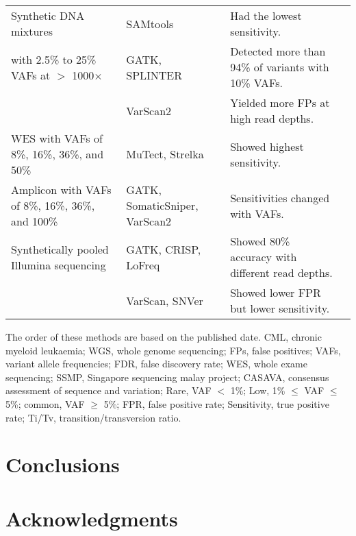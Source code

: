 \documentclass[11pt,reqno]{amsart}
\begin{document}
\begin{landscape}
\begin{table}[htbp]
\begin{threeparttable}
\begin{tabular}{rlrr}
    \midrule
    \multicolumn{1}{l}{Synthetic DNA mixtures } & SAMtools & \multicolumn{1}{l}{Had the lowest sensitivity.} &  \citealt{Spencer2014}\\
    \multicolumn{1}{l}{with 2.5\% to 25\% VAFs at $>$ 1000$\times$ } & GATK,  SPLINTER & \multicolumn{1}{l}{Detected more than 94\% of variants with 10\% VAFs.} &  \\
          & VarScan2 & \multicolumn{1}{l}{Yielded more FPs at high read depths.} &  \\

    \midrule
    \multicolumn{1}{l}{WES with VAFs of 8\%, 16\%, 36\%, and 50\%} & MuTect, Strelka & \multicolumn{1}{l}{Showed highest sensitivity.} &  \citealt{Xu2014}\\
    \multicolumn{1}{l}{Amplicon with VAFs of 8\%, 16\%, 36\%, and 100\%} & GATK, SomaticSniper, VarScan2 & \multicolumn{1}{l}{Sensitivities changed with VAFs.} &  \\

    \midrule
    \multicolumn{1}{l}{Synthetically pooled Illumina sequencing} & GATK, CRISP, LoFreq & \multicolumn{1}{l}{Showed 80\% accuracy with different read depths.} & \citealt{Huang2015} \\
          & VarScan, SNVer  & \multicolumn{1}{l}{Showed lower FPR but lower sensitivity.} &  \\

    \bottomrule
    \end{tabular}
   \begin{tablenotes}
	\item The order of these methods are based on the published date.
CML, chronic myeloid leukaemia;
WGS, whole genome sequencing;
FPs, false positives;
VAFs, variant allele frequencies;
FDR, false discovery rate;
WES, whole exame sequencing;
SSMP, Singapore sequencing malay project;
CASAVA, consensus assessment of sequence and variation;
Rare, VAF $<$ 1\%; Low, 1\% $\leqslant$ VAF $\leqslant$  5\%; common, VAF $\geqslant$ 5\%;
FPR, false positive rate;
Sensitivity, true positive rate;
Ti/Tv, transition/transversion ratio.
    \end{tablenotes}
\end{threeparttable}
\end{table}
\end{landscape}




\section{Conclusions}

\section{Acknowledgments}




\end{document}
